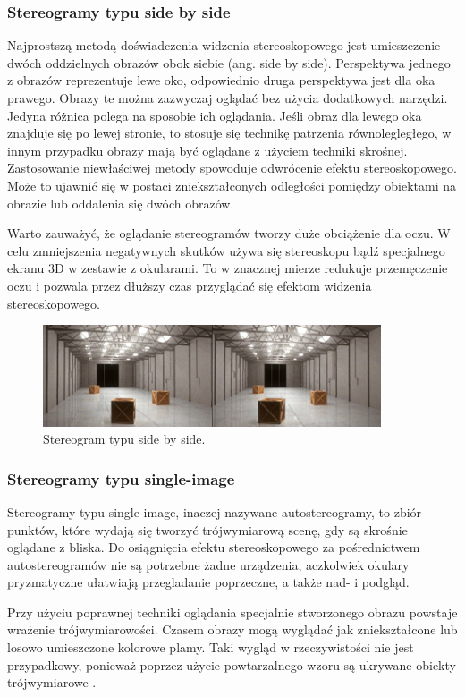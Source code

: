 \subsubsection{Stereogramy typu side by side}
Najprostszą metodą doświadczenia widzenia stereoskopowego jest umieszczenie dwóch oddzielnych obrazów obok siebie (ang. side by side). Perspektywa jednego z obrazów reprezentuje lewe oko, odpowiednio druga perspektywa jest dla oka prawego. Obrazy te można zazwyczaj oglądać bez użycia dodatkowych narzędzi. Jedyna różnica polega na sposobie ich oglądania. Jeśli obraz dla lewego oka znajduje się po lewej stronie, to stosuje się technikę patrzenia równolegległego, w innym przypadku obrazy mają być oglądane z użyciem techniki skrośnej. Zastosowanie niewłaściwej metody spowoduje odwrócenie efektu stereoskopowego. Może to ujawnić się w postaci zniekształconych odległości pomiędzy obiektami na obrazie lub oddalenia się dwóch obrazów.

Warto zauważyć, że oglądanie stereogramów tworzy duże obciążenie dla oczu. W celu zmniejszenia negatywnych skutków używa się stereoskopu bądź specjalnego ekranu 3D w zestawie z okularami. To w znacznej mierze redukuje przemęczenie oczu i pozwala przez dłuższy czas przyglądać się efektom widzenia stereoskopowego.
\begin{figure}[H]
		\centering
 		\includegraphics[width=10cm]{sbs.jpg}
    	\caption{Stereogram typu side by side\cite{sidebyside}.}
 		\label{rys1}
\end{figure}

\subsubsection{Stereogramy typu single-image} 
Stereogramy typu single-image, inaczej nazywane autostereogramy, to zbiór punktów, które wydają się tworzyć trójwymiarową scenę, gdy są skrośnie oglądane z bliska. Do osiągnięcia efektu stereoskopowego za pośrednictwem autostereogramów nie są potrzebne żadne urządzenia, aczkolwiek okulary pryzmatyczne ułatwiają przegladanie poprzeczne, a także nad- i podgląd.

Przy użyciu poprawnej techniki oglądania specjalnie stworzonego obrazu powstaje wrażenie trójwymiarowości. Czasem obrazy mogą wyglądać jak zniekształcone lub losowo umieszczone kolorowe plamy. Taki wygląd w rzeczywistości nie jest przypadkowy, ponieważ poprzez użycie powtarzalnego wzoru są ukrywane obiekty trójwymiarowe \cite{stereoscopythesis}.

